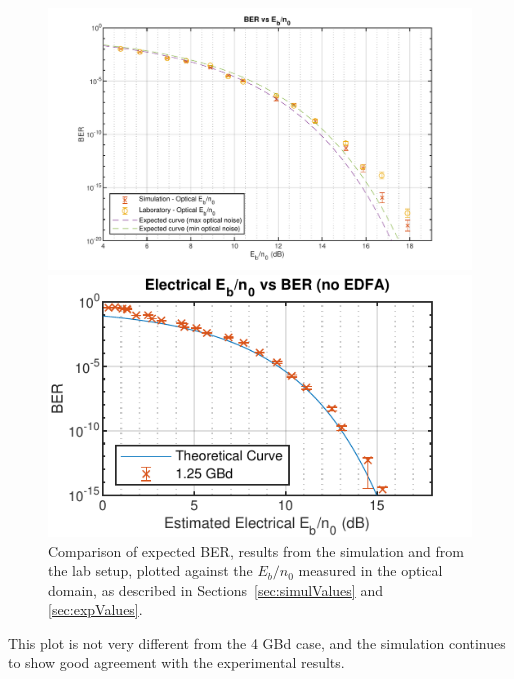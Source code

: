	\begin{figure}[H]
		\centering
		\begin{minipage}{0.45\textwidth}
			\centering
			\includegraphics[width=1\textwidth]
			{./sdf/m_qam_system/figures/experimental/results/1_25GBd_noEDFA/ebn0Curve_sim1_25_final.pdf}
			\subcaption{\label{fig:1.25GBdBERH}}
		\end{minipage}
		\begin{minipage}{0.45\textwidth}
			\centering
			\includegraphics[width=1\textwidth]
			{./sdf/m_qam_system/figures/experimental/results/1_25GBd_noEDFA/ebn0Curve_lab1_25_noEDFA_181204.pdf}
			\subcaption{\label{fig:1.25GBdBERHnoEDFA}}
		\end{minipage}
		\caption{Comparison of expected BER, results from the simulation and from
			the lab setup, plotted against the $E_b/n_0$ measured in the optical
			domain, as described in Sections~\ref{sec:simulValues} and
		\ref{sec:expValues}.\label{fig:4GBdBERH2}}
	\end{figure}

	This plot is not very different from the 4 GBd case, and the simulation
	continues to show good agreement with the experimental results.




